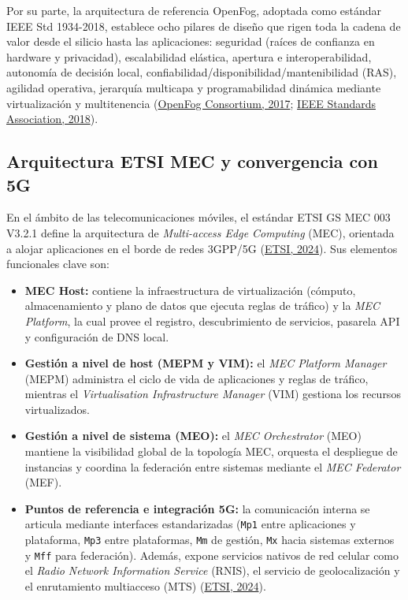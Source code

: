 \documentclass[12pt, letterpaper]{article}
\begin{document}
Por su parte, la arquitectura de referencia OpenFog, adoptada como estándar IEEE Std 1934-2018, establece ocho pilares de diseño que rigen toda la cadena de valor desde el silicio hasta las aplicaciones: seguridad (raíces de confianza en hardware y privacidad), escalabilidad elástica, apertura e interoperabilidad, autonomía de decisión local, confiabilidad/disponibilidad/mantenibilidad (RAS), agilidad operativa, jerarquía multicapa y programabilidad dinámica mediante virtualización y multitenencia (\protect\hyperlink{openfog2017}{OpenFog Consortium, 2017}; \protect\hyperlink{ieee2018}{IEEE Standards Association, 2018}).

\subsection{Arquitectura ETSI MEC y convergencia con 5G}

En el ámbito de las telecomunicaciones móviles, el estándar ETSI GS MEC 003 V3.2.1 define la arquitectura de \textit{Multi-access Edge Computing} (MEC), orientada a alojar aplicaciones en el borde de redes 3GPP/5G (\protect\hyperlink{etsi2024}{ETSI, 2024}). Sus elementos funcionales clave son:

\begin{itemize}
    \item \textbf{MEC Host:} contiene la infraestructura de virtualización (cómputo, almacenamiento y plano de datos que ejecuta reglas de tráfico) y la \textit{MEC Platform}, la cual provee el registro, descubrimiento de servicios, pasarela API y configuración de DNS local.
    \item \textbf{Gestión a nivel de host (MEPM y VIM):} el \textit{MEC Platform Manager} (MEPM) administra el ciclo de vida de aplicaciones y reglas de tráfico, mientras el \textit{Virtualisation Infrastructure Manager} (VIM) gestiona los recursos virtualizados.
    \item \textbf{Gestión a nivel de sistema (MEO):} el \textit{MEC Orchestrator} (MEO) mantiene la visibilidad global de la topología MEC, orquesta el despliegue de instancias y coordina la federación entre sistemas mediante el \textit{MEC Federator} (MEF).
    \item \textbf{Puntos de referencia e integración 5G:} la comunicación interna se articula mediante interfaces estandarizadas (\texttt{Mp1} entre aplicaciones y plataforma, \texttt{Mp3} entre plataformas, \texttt{Mm} de gestión, \texttt{Mx} hacia sistemas externos y \texttt{Mff} para federación). Además, expone servicios nativos de red celular como el \textit{Radio Network Information Service} (RNIS), el servicio de geolocalización y el enrutamiento multiacceso (MTS) (\protect\hyperlink{etsi2024}{ETSI, 2024}).
\end{itemize}
\end{document}
